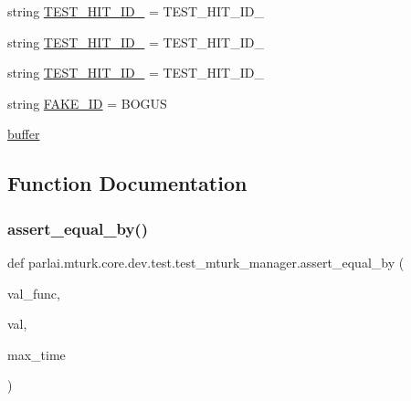 \begin{DoxyCompactItemize}
\item 
string \hyperlink{namespaceparlai_1_1mturk_1_1core_1_1dev_1_1test_1_1test__mturk__manager_a79ea3ed738e2bb08427d0df9736be933}{T\+E\+S\+T\+\_\+\+H\+I\+T\+\_\+\+I\+D\+\_} = \textquotesingle{}T\+E\+S\+T\+\_\+\+H\+I\+T\+\_\+\+I\+D\+\_\textquotesingle{}
\item 
string \hyperlink{namespaceparlai_1_1mturk_1_1core_1_1dev_1_1test_1_1test__mturk__manager_abe30231c839bbe56aa0275149db25b2e}{T\+E\+S\+T\+\_\+\+H\+I\+T\+\_\+\+I\+D\+\_} = \textquotesingle{}T\+E\+S\+T\+\_\+\+H\+I\+T\+\_\+\+I\+D\+\_\textquotesingle{}
\item 
string \hyperlink{namespaceparlai_1_1mturk_1_1core_1_1dev_1_1test_1_1test__mturk__manager_a572053154fc083c05f911544a8410fe1}{T\+E\+S\+T\+\_\+\+H\+I\+T\+\_\+\+I\+D\+\_} = \textquotesingle{}T\+E\+S\+T\+\_\+\+H\+I\+T\+\_\+\+I\+D\+\_\textquotesingle{}
\item 
string \hyperlink{namespaceparlai_1_1mturk_1_1core_1_1dev_1_1test_1_1test__mturk__manager_a394134290bf1ceec54772f7f00473639}{F\+A\+K\+E\+\_\+\+ID} = \textquotesingle{}B\+O\+G\+US\textquotesingle{}
\item 
\hyperlink{namespaceparlai_1_1mturk_1_1core_1_1dev_1_1test_1_1test__mturk__manager_aa1a430d335fde5f882f41d647e3a3d80}{buffer}
\end{DoxyCompactItemize}


\subsection{Function Documentation}
\mbox{\label{namespaceparlai_1_1mturk_1_1core_1_1dev_1_1test_1_1test__mturk__manager_a618dc967426525fdbd87e484bee59c1b}} 
\subsubsection{\texorpdfstring{assert\+\_\+equal\+\_\+by()}{assert\_equal\_by()}}
{\footnotesize\ttfamily def parlai.\+mturk.\+core.\+dev.\+test.\+test\+\_\+mturk\+\_\+manager.\+assert\+\_\+equal\+\_\+by (\begin{DoxyParamCaption}\item[{}]{val\+\_\+func,  }\item[{}]{val,  }\item[{}]{max\+\_\+time }\end{DoxyParamCaption})}



